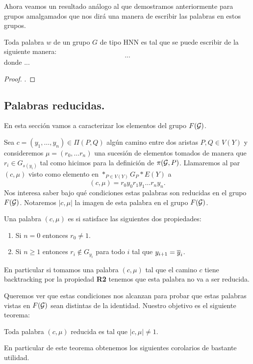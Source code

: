\documentclass[tesis.tex]{subfiles}
\newcommand{\cG}{ {\cal G} }
\begin{document}
Ahora veamos un resultado análogo al que demostramos anteriormente para grupos amalgamados que nos dirá una manera de escribir las palabras en estos grupos.
\begin{teo}[Britton]
	Toda palabra $w$ de un grupo $G$ de tipo HNN es tal que se puede escribir de la siguiente manera:
	\[
	...
	\]
	donde ...
\end{teo}
\begin{proof}
	.
\end{proof}
\subsection{Palabras reducidas.}

En esta sección vamos a caracterizar los elementos del grupo $F(\cG)$.

Sea $c=(y_1, \dots, y_n) \in \Pi(P,Q)$ algún camino entre dos aristas $P,Q \in V(Y)$ y consideremos $\mu = (r_0, \dots r_n)$ una sucesión de elementos tomados de manera que $r_i \in G_{s(y_i)}$ tal como hicimos para la definición de $\pi(\cG, P)$.
Llamaremos al par $(c, \mu)$ visto como elemento en $\ast_{P \in V(Y)}G_P \ast E(Y)$ a 
\[
(c,\mu) = r_0 y_0 r_1 y_1 \dots r_n y_n.
\]
Nos interesa saber bajo qué condiciones estas palabras son reducidas en el grupo $F(\cG)$.
Notaremos $|c,\mu|$ la imagen de esta palabra en el grupo $F(\cG)$.

\begin{deff}
	Una palabra $(c, \mu)$ es  si satisface las siguientes dos propiedades:
	\begin{enumerate}[R1.]
		\item Si $n=0$ entonces $r_0 \neq 1$.
		\item Si $n \ge 1$ entonces $r_i \notin G_{y_i}$ para todo $i$ tal que $y_{i+1} = \overline y_{i}$.
	\end{enumerate}
\end{deff}
En particular si tomamos una palabra $(c, \mu)$ tal que el camino $c$ tiene backtracking por la propiedad \textbf{R2} tenemos que esta palabra no va a ser reducida.

Queremos ver que estas condiciones nos alcanzan para probar que estas palabras vistas en $F(\cG)$ sean distintas de la identidad.
Nuestro objetivo es el siguiente teorema:
\begin{teo}\label{teo_pal_red}
	Toda palabra $(c, \mu)$ reducida es tal que $|c,\mu| \neq 1$.
\end{teo}

En particular de este teorema obtenemos los siguientes corolarios de bastante utilidad.
\end{document}

